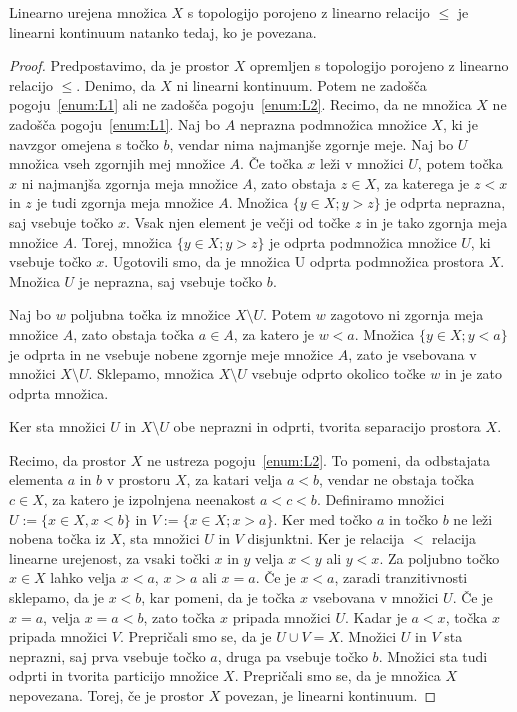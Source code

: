 \documentclass[../TG_magistrsko_delo_sections.tex]{subfiles}
\begin{document}
\begin{trditev}
Linearno urejena množica $X$ s topologijo porojeno z linearno relacijo $\leq$ je linearni kontinuum natanko tedaj, ko je povezana.
\end{trditev}
\begin{proof}
Predpostavimo, da je prostor $X$ opremljen s topologijo porojeno z linearno relacijo $\leq$. Denimo, da $X$ ni linearni kontinuum. Potem ne zadošča pogoju~\ref{enum:L1} ali ne zadošča pogoju~\ref{enum:L2}. Recimo, da ne množica $X$ ne zadošča pogoju~\ref{enum:L1}. Naj bo $A$ neprazna podmnožica množice $X$, ki je navzgor omejena s točko $b$, vendar nima najmanjše zgornje meje. Naj bo $U$ množica vseh zgornjih mej množice $A$. Če točka $x$ leži v množici $U$, potem točka $x$ ni najmanjša zgornja meja množice $A$, zato obstaja $z \in X$, za katerega je $z < x$ in $z$ je tudi zgornja meja množice $A$. Množica $\{y \in X; y > z\}$ je odprta neprazna, saj vsebuje točko $x$. Vsak njen element je večji od točke $z$ in je tako zgornja meja množice $A$. Torej, množica $\{y \in X; y > z\}$ je odprta podmnožica množice $U$, ki vsebuje točko $x$. Ugotovili smo, da je množica U odprta podmnožica prostora $X$. Množica $U$ je neprazna, saj vsebuje točko $b$. 

Naj bo $w$ poljubna točka iz množice $X \setminus U$. Potem $w$ zagotovo ni zgornja meja množice $A$, zato obstaja točka $a \in A$, za katero je $w < a$. Množica $\{y \in X; y< a\}$ je odprta in ne vsebuje nobene zgornje meje množice $A$, zato je vsebovana v množici $X \setminus U$. Sklepamo, množica $X \setminus U$ vsebuje odprto okolico točke $w$ in je zato odprta množica. 

Ker sta množici $U$ in $X \setminus U$ obe neprazni in odprti, tvorita separacijo prostora $X$. 

Recimo, da prostor $X$ ne ustreza pogoju~\ref{enum:L2}. To pomeni, da odbstajata elementa $a$ in $b$ v prostoru $X$, za katari velja $a < b$, vendar ne obstaja točka $c \in X$, za katero je izpolnjena neenakost $a < c < b$. Definiramo množici $U := \{x \in X, x <b\}$ in $V := \{x\in X;x>a\}$. Ker med točko $a$ in točko $b$ ne leži nobena točka iz $X$, sta množici $U$ in $V$ disjunktni. Ker je relacija $<$ relacija linearne urejenost, za vsaki točki $x$ in $y$ velja $x < y$ ali $y < x$. Za poljubno točko $x \in X$ lahko velja $x<a$, $x>a$ ali $x=a$.
Če je $x<a$, zaradi tranzitivnosti sklepamo, da je $x<b$, kar pomeni, da je točka $x$ vsebovana v množici $U$. Če je $x=a$, velja $x=a<b$, zato točka $x$ pripada množici $U$. Kadar je $a<x$, točka $x$ pripada množici $V$. Prepričali smo se, da je $U \cup V = X$. Množici $U$ in $V$ sta neprazni, saj prva vsebuje točko $a$, druga pa vsebuje točko $b$. Množici sta tudi odprti in tvorita particijo množice $X$. Prepričali smo se, da je množica $X$ nepovezana.
Torej, če je prostor $X$ povezan, je linearni kontinuum.


\end{proof}
\end{document}
